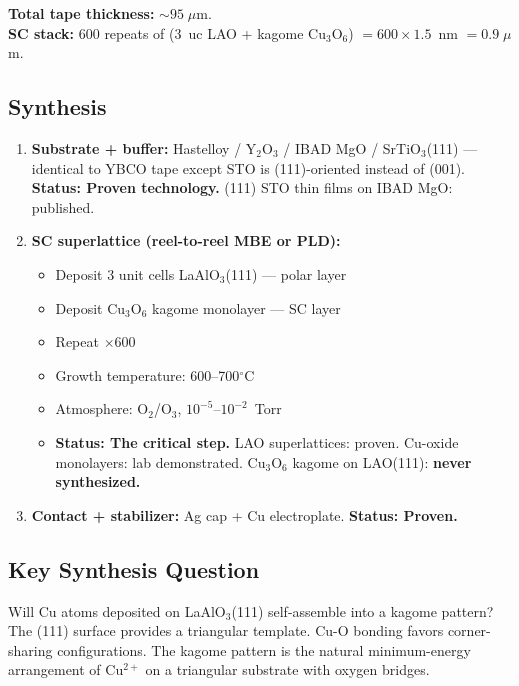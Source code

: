 \documentclass[11pt, a4paper]{article}
\begin{document}
\textbf{Total tape thickness:} $\sim 95\;\mu$m. \\
\textbf{SC stack:} 600 repeats of (3~uc LAO + kagome Cu$_3$O$_6$)
$= 600 \times 1.5$~nm $= 0.9\;\mu$m.

\subsection{Synthesis}

\begin{enumerate}
  \item \textbf{Substrate + buffer:} Hastelloy / Y$_2$O$_3$ / IBAD MgO
        / SrTiO$_3$(111) --- identical to YBCO tape except STO is
        (111)-oriented instead of (001).
        \textcolor{nm-green}{\textbf{Status: Proven technology.}}
        (111) STO thin films on IBAD MgO: published.

  \item \textbf{SC superlattice (reel-to-reel MBE or PLD):}
    \begin{itemize}[nosep]
      \item Deposit 3 unit cells LaAlO$_3$(111) --- polar layer
      \item Deposit Cu$_3$O$_6$ kagome monolayer --- SC layer
      \item Repeat $\times 600$
      \item Growth temperature: 600--700$^\circ$C
      \item Atmosphere: O$_2$/O$_3$, $10^{-5}$--$10^{-2}$~Torr
      \item \textcolor{nm-red}{\textbf{Status: The critical step.}}
            LAO superlattices: proven. Cu-oxide monolayers: lab
            demonstrated. Cu$_3$O$_6$ kagome on LAO(111):
            \textbf{never synthesized.}
    \end{itemize}

  \item \textbf{Contact + stabilizer:} Ag cap + Cu electroplate.
        \textcolor{nm-green}{\textbf{Status: Proven.}}
\end{enumerate}

\subsection{Key Synthesis Question}

Will Cu atoms deposited on LaAlO$_3$(111) self-assemble into a
kagome pattern? The (111) surface provides a triangular template.
Cu-O bonding favors corner-sharing configurations. The kagome
pattern is the natural minimum-energy arrangement of Cu$^{2+}$
on a triangular substrate with oxygen bridges.
\end{document}
